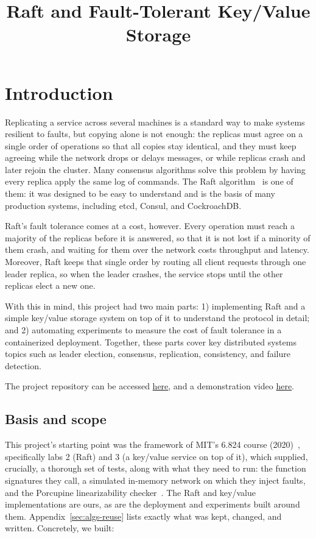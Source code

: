 \documentclass[conference]{IEEEtran}
\begin{document}
\title{Raft and Fault-Tolerant Key/Value Storage}

\author{
\and
{}
}

\maketitle

\section{Introduction}
Replicating a service across several machines is a standard way to make systems resilient to faults, but copying alone is not enough:
the replicas must agree on a single order of operations so that all copies stay identical, and they must keep agreeing while the network drops or delays messages,
or while replicas crash and later rejoin the cluster.
Many consensus algorithms solve this problem by having every replica apply the same log of commands. The Raft algorithm~\cite{raft2014} is one of them:
it was designed to be easy to understand and is the basis of many production systems, including etcd, Consul, and CockroachDB\@.

Raft's fault tolerance comes at a cost, however. Every operation must reach a majority of the replicas before it is answered, so that it is not lost if a minority of them crash,
and waiting for them over the network costs throughput and latency. Moreover, Raft keeps that single order by routing all client requests through one leader replica, so when the leader crashes,
the service stops until the other replicas elect a new one.

With this in mind, this project had two main parts: 1) implementing Raft and a simple key/value storage system on top of it to understand the protocol in detail;
and 2) automating experiments to measure the cost of fault tolerance in a containerized deployment. Together, these parts cover key distributed systems topics such as leader election, consensus,
replication, consistency, and failure detection.

The project repository can be accessed \href{https://github.com/Everton-Colombo/raft_and_kv-raft}{here}, and a demonstration video \href{https://youtu.be/8nt4VyT0qKw}{here}.

\subsection*{Basis and scope}
This project's starting point was the framework of MIT's 6.824 course (2020)~\cite{mit6824}, specifically labs 2 (Raft) and 3 (a key/value service on top of it), which supplied, crucially,
a thorough set of tests, along with what they need to run: the function signatures they call, a simulated in-memory network on which they inject faults,
and the Porcupine linearizability checker~\cite{porcupine}. The Raft and key/value implementations are ours, as are the deployment and experiments built around them.
Appendix~\ref{sec:algs-reuse} lists exactly what was kept, changed, and written. Concretely, we built:
\end{document}

